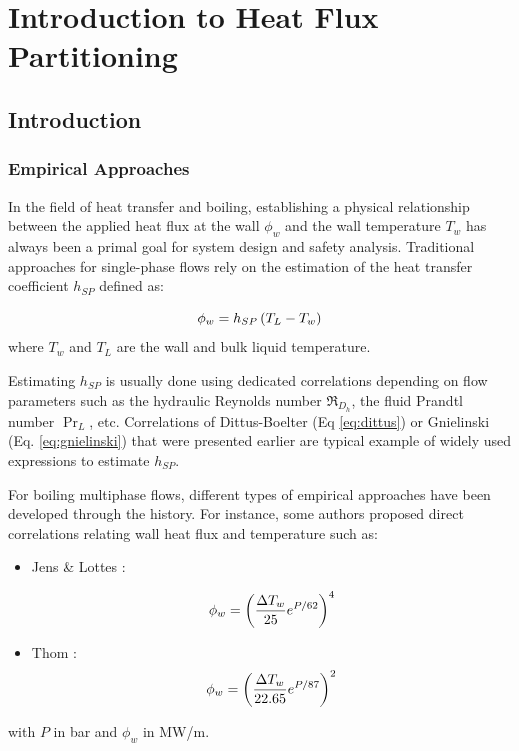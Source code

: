 
\chapter{Introduction to Heat Flux Partitioning} %

\label{chap:HFP_bib} %

\minitoc

\section{Introduction}

\subsection{Empirical Approaches}

In the field of heat transfer and boiling, establishing a physical relationship between the applied heat flux at the wall $\phi_{w}$ and the wall temperature $T_{w}$ has always been a primal goal for system design and safety analysis. Traditional approaches for single-phase flows rely on the estimation of the heat transfer coefficient $h_{SP}$ defined as:

\begin{equation}
\phi_{w} = h_{SP} \left( T_{L} - T_{w} \right)
\end{equation}
where $T_{w}$ and $T_{L}$ are the wall and bulk liquid temperature. 

\npar
Estimating $h_{SP}$ is usually done using dedicated correlations depending on flow parameters such as the hydraulic Reynolds number $\Re_{D_{h}}$, the fluid Prandtl number $\Pr_{L}$, etc. Correlations of Dittus-Boelter (Eq \ref{eq:dittus}) or Gnielinski (Eq. \ref{eq:gnielinski}) that were presented earlier are typical example of widely used expressions to estimate $h_{SP}$.

\npar

For boiling multiphase flows, different types of empirical approaches have been developed through the history. For instance, some authors proposed direct correlations relating wall heat flux and temperature such as:

\begin{itemize}
\item Jens \& Lottes \cite{jens_analysis_1951}:

\begin{equation}
\phi_{w} = \left(  \frac{\Delta T_{w} }{25} e^{P / 62}	 \right)^{4}
\label{eq:jens_correl}
\end{equation}

\item Thom \etal \cite{thom_boiling_1967}:
\begin{equation}
\phi_{w} = \left(  \frac{\Delta T_{w} }{22.65} e^{P / 87}	 \right)^{2}
\label{eq:thom_correl}
\end{equation}
\end{itemize} 
with $P$ in bar and $\phi_{w}$ in MW/m.

